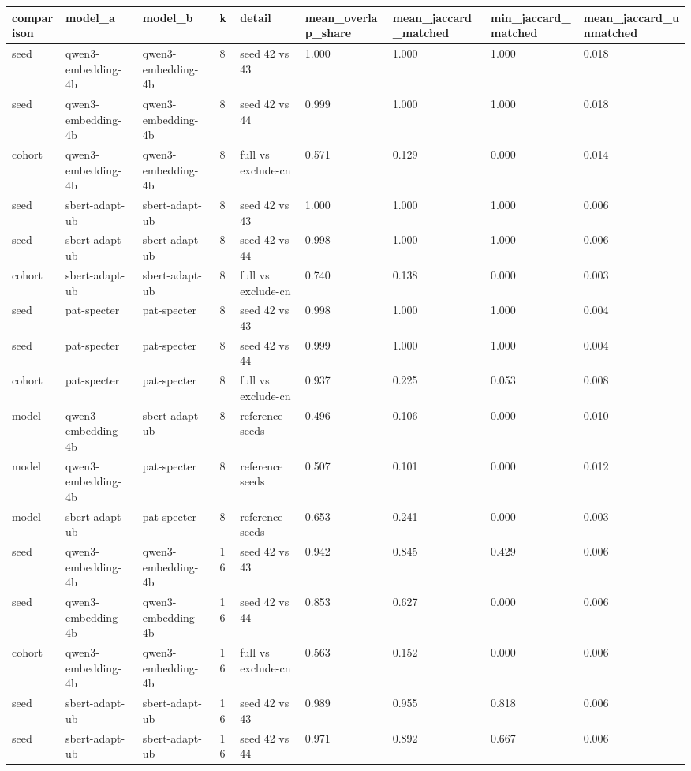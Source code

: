 \begin{tabular}{lllllllll}
\toprule
comparison & model\_a & model\_b & k & detail & mean\_overlap\_share & mean\_jaccard\_matched & min\_jaccard\_matched & mean\_jaccard\_unmatched \\
\midrule
seed & qwen3-embedding-4b & qwen3-embedding-4b & 8 & seed 42 vs 43 & 1.000 & 1.000 & 1.000 & 0.018 \\
seed & qwen3-embedding-4b & qwen3-embedding-4b & 8 & seed 42 vs 44 & 0.999 & 1.000 & 1.000 & 0.018 \\
cohort & qwen3-embedding-4b & qwen3-embedding-4b & 8 & full vs exclude-cn & 0.571 & 0.129 & 0.000 & 0.014 \\
seed & sbert-adapt-ub & sbert-adapt-ub & 8 & seed 42 vs 43 & 1.000 & 1.000 & 1.000 & 0.006 \\
seed & sbert-adapt-ub & sbert-adapt-ub & 8 & seed 42 vs 44 & 0.998 & 1.000 & 1.000 & 0.006 \\
cohort & sbert-adapt-ub & sbert-adapt-ub & 8 & full vs exclude-cn & 0.740 & 0.138 & 0.000 & 0.003 \\
seed & pat-specter & pat-specter & 8 & seed 42 vs 43 & 0.998 & 1.000 & 1.000 & 0.004 \\
seed & pat-specter & pat-specter & 8 & seed 42 vs 44 & 0.999 & 1.000 & 1.000 & 0.004 \\
cohort & pat-specter & pat-specter & 8 & full vs exclude-cn & 0.937 & 0.225 & 0.053 & 0.008 \\
model & qwen3-embedding-4b & sbert-adapt-ub & 8 & reference seeds & 0.496 & 0.106 & 0.000 & 0.010 \\
model & qwen3-embedding-4b & pat-specter & 8 & reference seeds & 0.507 & 0.101 & 0.000 & 0.012 \\
model & sbert-adapt-ub & pat-specter & 8 & reference seeds & 0.653 & 0.241 & 0.000 & 0.003 \\
seed & qwen3-embedding-4b & qwen3-embedding-4b & 16 & seed 42 vs 43 & 0.942 & 0.845 & 0.429 & 0.006 \\
seed & qwen3-embedding-4b & qwen3-embedding-4b & 16 & seed 42 vs 44 & 0.853 & 0.627 & 0.000 & 0.006 \\
cohort & qwen3-embedding-4b & qwen3-embedding-4b & 16 & full vs exclude-cn & 0.563 & 0.152 & 0.000 & 0.006 \\
seed & sbert-adapt-ub & sbert-adapt-ub & 16 & seed 42 vs 43 & 0.989 & 0.955 & 0.818 & 0.006 \\
seed & sbert-adapt-ub & sbert-adapt-ub & 16 & seed 42 vs 44 & 0.971 & 0.892 & 0.667 & 0.006 \\

\end{tabular}

